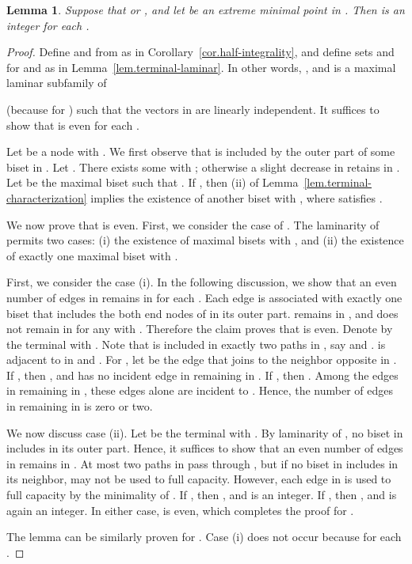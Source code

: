 \documentclass{article}
\newtheorem{lemma}{Lemma}
\begin{document}
\begin{lemma}\label{lem.degree}
Suppose that  or , and 
let  be an extreme minimal point in . Then
 is an integer for each .
\end{lemma}
 \begin{proof}
  Define  and 
from  as in Corollary~\ref{cor.half-integrality},
and define sets  and  
for  and 
as in Lemma~\ref{lem.terminal-laminar}.
In other words,
,
and  is a maximal laminar subfamily of 

(because  for )
such that the vectors in 
are linearly independent.
It suffices to show that  is even for each .

Let  be a node with . 
We first observe that  is included by the outer part of some biset in .
Let .
There exists some  with ; otherwise 
a slight decrease in  retains  in .
Let  be the maximal biset such that .
If , then (ii) of Lemma~\ref{lem.terminal-characterization} implies
the existence of another biset  with ,
where  satisfies .

We now prove that  is even. First, we consider the case of .
The laminarity of  permits two cases: 
(i) the existence of maximal bisets 
with ,
and (ii) 
the existence of exactly one maximal biset  with
.

First, we consider the case (i).
In the following discussion,
we show that an even number of edges in  remains in 
for each .
Each edge  is associated with
exactly one biset  that includes the both end nodes of  in its outer
part. 
 remains in , and does not remain in  
for any  with .
Therefore the claim proves that  is even.
Denote by  the terminal with .
Note that
 is included in exactly two paths in ,
say  and . 
 is adjacent to  in  and . 
For , let  be the edge that joins  to the neighbor opposite  in . 
If , then , and  has no incident edge in  remaining in .
If , then . Among the edges in  remaining in ,
these edges alone are incident to .
Hence, the number of edges in  remaining in 
is zero or two.

We now discuss case (ii).
Let  be the terminal with .
By laminarity of , no biset 
in  includes  in its outer part. Hence, 
it suffices to show that an even number of edges in 
 remains in .
At most two paths in  pass through , but 
if no biset in  includes  in its neighbor,
 may not be used to full capacity.
However, each edge in  is used to full capacity by the minimality of .
If , then , and 
is an integer. If , then , and  is again an integer.
In either case,  is even, which completes the proof for .

The lemma can be similarly proven for .
Case (i) does not occur because 
for each .
 \end{proof}
\end{document}
